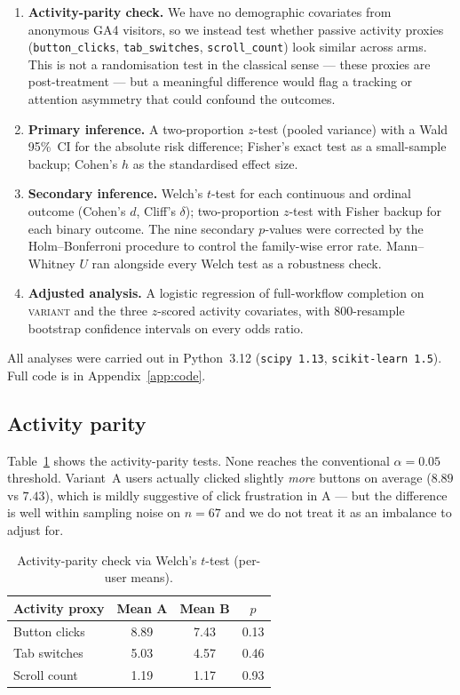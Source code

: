 \documentclass[11pt,a4paper]{article}
\begin{document}
\begin{enumerate}[leftmargin=1.4em,itemsep=2pt]
\item \textbf{Activity-parity check.} We have no demographic
  covariates from anonymous GA4 visitors, so we instead test
  whether passive activity proxies (\texttt{button\_clicks},
  \texttt{tab\_switches}, \texttt{scroll\_count}) look similar
  across arms. This is not a randomisation test in the classical
  sense — these proxies are post-treatment — but a meaningful
  difference would flag a tracking or attention asymmetry that
  could confound the outcomes.
\item \textbf{Primary inference.} A two-proportion $z$-test
  (pooled variance) with a Wald 95\%~CI for the absolute risk
  difference; Fisher's exact test as a small-sample backup; Cohen's
  $h$ as the standardised effect size.
\item \textbf{Secondary inference.} Welch's $t$-test for each
  continuous and ordinal outcome (Cohen's $d$, Cliff's $\delta$);
  two-proportion $z$-test with Fisher backup for each binary
  outcome. The nine secondary $p$-values were corrected by the
  Holm--Bonferroni procedure to control the family-wise error rate.
  Mann--Whitney $U$ ran alongside every Welch test as a robustness
  check.
\item \textbf{Adjusted analysis.} A logistic regression of
  full-workflow completion on \textsc{variant} and the three
  $z$-scored activity covariates, with $800$-resample bootstrap
  confidence intervals on every odds ratio.
\end{enumerate}

All analyses were carried out in Python~3.12
(\texttt{scipy~1.13}, \texttt{scikit-learn~1.5}). Full code is in
Appendix~\ref{app:code}.

\subsection{Activity parity}
Table~\ref{tab:bal} shows the activity-parity tests. None reaches
the conventional $\alpha=0.05$ threshold. Variant~A users actually
clicked slightly \emph{more} buttons on average ($8.89$ vs $7.43$),
which is mildly suggestive of click frustration in A — but the
difference is well within sampling noise on $n=67$ and we do not
treat it as an imbalance to adjust for.

\begin{table}[ht]
\centering\small
\renewcommand{\arraystretch}{1.15}
\caption{Activity-parity check via Welch's $t$-test
(per-user means).}
\label{tab:bal}
\begin{tabular}{@{}lccc@{}}
\toprule
\textbf{Activity proxy} & \textbf{Mean A} & \textbf{Mean B} & \textbf{$p$} \\
\midrule
Button clicks  & 8.89 & 7.43 & 0.13 \\
Tab switches   & 5.03 & 4.57 & 0.46 \\
Scroll count   & 1.19 & 1.17 & 0.93 \\
\bottomrule
\end{tabular}
\end{table}
\end{document}
